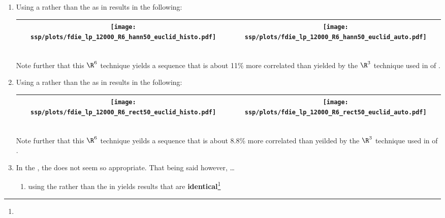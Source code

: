 \begin{example}
\begin{enumerate}
  \item \label{item:fdie_lp_R6_hann50_euclid}
        Using a  rather than the 
         as in 
        results in the following: %
     \\\begin{tabular}{|>{\scs}c|>{\scs}c|}
          \hline
          \texttt{[image: ssp/plots/fdie\_lp\_12000\_R6\_hann50\_euclid\_histo.pdf]}%
         &\texttt{[image: ssp/plots/fdie\_lp\_12000\_R6\_hann50\_euclid\_auto.pdf]}
        \\\hline
     \end{tabular}\\
     Note further that this $\R^6$ technique yields a sequence that is about 11\% more correlated than 
     yielded by the $\R^3$ technique
     used in  of .

  \item \label{item:fdie_lp_R6_rect50_euclid}
        Using a  rather than the 
         as in 
        results in the following: %
     \\\begin{tabular}{|>{\scs}c|>{\scs}c|}
          \hline
          \texttt{[image: ssp/plots/fdie\_lp\_12000\_R6\_rect50\_euclid\_histo.pdf]}%
         &\texttt{[image: ssp/plots/fdie\_lp\_12000\_R6\_rect50\_euclid\_auto.pdf]}
        \\\hline
     \end{tabular}\\
     Note further that this $\R^6$ technique yeilds a sequence that is about 8.8\% more correlated than yeilded by the $\R^3$ technique
     used in  of .

  \item In the , the  does not seem so appropriate.
        That being said however, \ldots 
    \begin{enumerate}
      \item using the  rather than the  in 
             yields results that are 
            \textbf{identical}\footnote{} %


\end{enumerate}
\end{enumerate}
\end{example}
